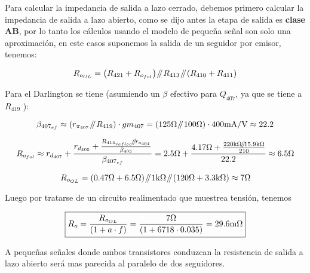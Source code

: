 \vspace{1.5cm}
\label{calculated_zo}

Para calcular la impedancia de salida a lazo cerrado, debemos primero calcular la impedancia de salida a lazo abierto, como se dijo antes la etapa de salida es \textbf{clase AB}, por lo tanto los cálculos usando el modelo de pequeña señal son solo una aproximación, en este casos suponemos la salida de un seguidor por emisor, tenemos:

\begin{equation}
R_{o_{OL}} = \left( R_{421} + R_{o_{fol}} \right) \parallelresistors R_{413} \parallelresistors \left( R_{410} + R_{411} \right) 
\end{equation}


Para el Darlington se tiene (asumiendo un $\beta$ efectivo para $Q_{407}$, ya que se tiene a $R_{419}$ ):

\begin{equation}
\beta_{407_{ef}} \approx \left( r_{\pi_{407}} \parallelresistors R_{419} \right) \cdot gm_{407} = \left( 125 \si[per-mode=symbol]{\ohm} \parallelresistors 100 \si[per-mode=symbol]{\ohm} \right) \cdot 400 \si[per-mode=symbol]{\milli\ampere\per\volt} \approx 22.2
\end{equation}


\begin{equation}
R_{o_{fol}} \approx r_{d_{407}} + \frac{ r_{d_{405}} + \frac{ R_{414_{reflec}} \parallelresistors r_{o_{404} }   }{ \beta_{405}} }{ \beta_{407_{ef}} } = 
2.5 \si[per-mode=symbol]{\ohm} + \frac{ 4.17 \si[per-mode=symbol]{\ohm} + \frac{ 220 \si[per-mode=symbol]{\kilo\ohm} \parallelresistors 15.9 \si[per-mode=symbol]{\kilo\ohm}   }{ 210 }}{ 22.2  } \approx 6.5 \si[per-mode=symbol]{\ohm}
\end{equation}


\begin{equation}
R_{o_{OL}} = \left( 0.47 \si[per-mode=symbol]{\ohm} + 6.5 \si[per-mode=symbol]{\ohm} \right) \parallelresistors 1 \si[per-mode=symbol]{\kilo\ohm} \parallelresistors \left( 120 \si[per-mode=symbol]{\ohm} + 3.3 \si[per-mode=symbol]{\kilo\ohm} \right) \approx 7 \si[per-mode=symbol]{\ohm}
\end{equation}


Luego por tratarse de un circuito realimentado que muestrea tensión, tenemos

\begin{equation}
\boxed{ R_{o} = \frac{R_{o_{OL}}}{\left(1 + a \cdot f \right)} = \frac{7 \si[per-mode=symbol]{\ohm}}{\left(1 + 6718 \cdot 0.035 \right)} = 29.6 \si[per-mode=symbol]{\milli\ohm} }
\end{equation}


A pequeñas señales donde ambos transistores conduzcan la resistencia de salida a lazo abierto será mas parecida al paralelo de dos seguidores.



\vfill

\clearpage
